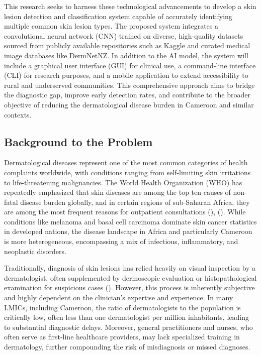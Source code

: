 \documentclass[
  12pt,
  oneside]{article}
\begin{document}
This research seeks to harness these technological advancements to
develop a skin lesion detection and classification system capable of
accurately identifying multiple common skin lesion types. The proposed
system integrates a convolutional neural network (CNN) trained on
diverse, high-quality datasets sourced from publicly available
repositories such as Kaggle and curated medical image databases like
DermNetNZ. In addition to the AI model, the system will include a
graphical user interface (GUI) for clinical use, a command-line
interface (CLI) for research purposes, and a mobile application to
extend accessibility to rural and underserved communities. This
comprehensive approach aims to bridge the diagnostic gap, improve early
detection rates, and contribute to the broader objective of reducing the
dermatological disease burden in Cameroon and similar contexts.

\subsection{Background to the Problem}\label{background-to-the-problem}

Dermatological diseases represent one of the most common categories of
health complaints worldwide, with conditions ranging from self-limiting
skin irritations to life-threatening malignancies. The World Health
Organization (WHO) has repeatedly emphasized that skin diseases are
among the top ten causes of non-fatal disease burden globally, and in
certain regions of sub-Saharan Africa, they are among the most frequent
reasons for outpatient consultations (), (). While
conditions like melanoma and basal cell carcinoma dominate skin cancer
statistics in developed nations, the disease landscape in Africa and
particularly Cameroon is more heterogeneous, encompassing a mix of
infectious, inflammatory, and neoplastic disorders.

Traditionally, diagnosis of skin lesions has relied heavily on visual
inspection by a dermatologist, often supplemented by dermoscopic
evaluation or histopathological examination for suspicious cases
(). However, this
process is inherently subjective and highly dependent on the clinician's
expertise and experience. In many LMICs, including Cameroon, the ratio
of dermatologists to the population is critically low, often less than
one dermatologist per million inhabitants, leading to substantial
diagnostic delays. Moreover, general practitioners and nurses, who often
serve as first-line healthcare providers, may lack specialized training
in dermatology, further compounding the risk of misdiagnosis or missed
diagnoses.
\end{document}
